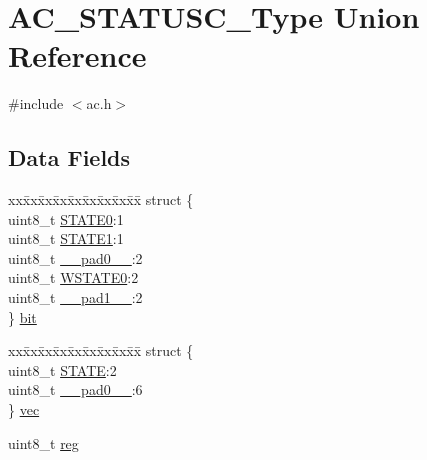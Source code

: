 \hypertarget{union_a_c___s_t_a_t_u_s_c___type}{}\section{A\+C\+\_\+\+S\+T\+A\+T\+U\+S\+C\+\_\+\+Type Union Reference}
\label{union_a_c___s_t_a_t_u_s_c___type}


{\ttfamily \#include $<$ac.\+h$>$}

\subsection*{Data Fields}
\begin{DoxyCompactItemize}
\item 
\begin{tabbing}
xx\=xx\=xx\=xx\=xx\=xx\=xx\=xx\=xx\=\kill
struct \{\\
\>uint8\_t \mbox{\hyperlink{union_a_c___s_t_a_t_u_s_c___type_a88b590631c8b51e4652834989115088d}{STATE0}}:1\\
\>uint8\_t \mbox{\hyperlink{union_a_c___s_t_a_t_u_s_c___type_afb27ce50eca91592253cc05f0120c932}{STATE1}}:1\\
\>uint8\_t \mbox{\hyperlink{union_a_c___s_t_a_t_u_s_c___type_a8b4eebe79ded0459acec2f4950102ba3}{\_\_pad0\_\_}}:2\\
\>uint8\_t \mbox{\hyperlink{union_a_c___s_t_a_t_u_s_c___type_aa7cf9eb386cc7454040a563168ba79a3}{WSTATE0}}:2\\
\>uint8\_t \mbox{\hyperlink{union_a_c___s_t_a_t_u_s_c___type_a77f12d2e278bd5c07712648ac0df5e08}{\_\_pad1\_\_}}:2\\
\} \mbox{\hyperlink{union_a_c___s_t_a_t_u_s_c___type_a555948ef09b3deabb6d1cfdc99c08cd9}{bit}}\\

\end{tabbing}\item 
\begin{tabbing}
xx\=xx\=xx\=xx\=xx\=xx\=xx\=xx\=xx\=\kill
struct \{\\
\>uint8\_t \mbox{\hyperlink{union_a_c___s_t_a_t_u_s_c___type_a0ee5c1482a272080958f6eb898bc0358}{STATE}}:2\\
\>uint8\_t \mbox{\hyperlink{union_a_c___s_t_a_t_u_s_c___type_a8b4eebe79ded0459acec2f4950102ba3}{\_\_pad0\_\_}}:6\\
\} \mbox{\hyperlink{union_a_c___s_t_a_t_u_s_c___type_ad14d6a99dd8a7ac676a047034db6ac55}{vec}}\\

\end{tabbing}\item 
uint8\+\_\+t \mbox{\hyperlink{union_a_c___s_t_a_t_u_s_c___type_a9428adc9af4653a2050e2536b55dec8d}{reg}}
\end{DoxyCompactItemize}


